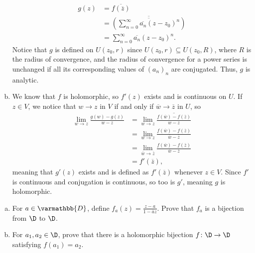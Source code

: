 \documentclass[10pt]{mypackage}
\renewcommand*{\mathbb}[1]{\varmathbb{#1}}
\begin{document}
\begin{solution}
\begin{enumerate}[(a)]
      \begin{align*}
        g(z) &= \overline{f\left( \overline{z} \right)}\\
             &= \overline{ \left( \overline{\sum_{n=0}^{\infty} \overline{a_n} \left( z-z_0 \right)^{n}} \right) }\\
             &= \sum_{n=0}^{\infty} \overline{a_n} \left( z-z_0 \right)^{n}.
      \end{align*}
      Notice that $g$ is defined on $U\left( z_0,r \right)$ since $U\left( z_0,r \right)\subseteq U\left( z_0,R \right)$, where $R$ is the radius of convergence, and the radius of convergence for a power series is unchanged if all its corresponding values of $\left( a_n \right)_n$ are conjugated. Thus, $g$ is analytic.
    \item We know that $f$ is holomorphic, so $f'(z)$ exists and is continuous on $U$. If $z\in V$, we notice that $w\rightarrow z$ in $V$ if and only if $ \overline{w}\rightarrow \overline{z} $ in $U$, so
      \begin{align*}
        \lim_{w\rightarrow z} \frac{g\left( w \right)-g\left( z \right)}{w-z} &= \lim_{w\rightarrow z} \overline{\frac{f\left( \overline{w} \right)-f\left( \overline{z} \right)}{ w-z }}\\
                                                                              &= \lim_{ w\rightarrow z }  \frac{f\left( \overline{w} \right) - f\left( \overline{z} \right)}{ \overline{w} - \overline{z} }\\
                                                                              &= \lim_{ \overline{w}\rightarrow \overline{z} } \frac{f\left( \overline{w} \right) - f\left( \overline{z} \right)}{ \overline{w} - \overline{z} }\\
                                                                              &= f'\left( \overline{z} \right),
      \end{align*}
      meaning that $g'(z)$ exists and is defined as $f'\left( \overline{z} \right)$ whenever $z\in V$. Since $f'$ is continuous and conjugation is continuous, so too is $g'$, meaning $g$ is holomorphic.
  \end{enumerate}
\end{solution}
\begin{problem}[Problem 6]\hfill
  \begin{enumerate}[(a)]
    \item For $a\in \mathbb{D}$, define $f_a(z) = \frac{z-a}{1- \overline{a}z}$. Prove that $f_a$ is a bijection from $\D$ to $\D$.
    \item For $a_1,a_2\in \D$, prove that there is a holomorphic bijection $f\colon \D\rightarrow \D$ satisfying $f\left( a_1 \right) = a_2$.
  \end{enumerate}
\end{problem}
\end{document}
